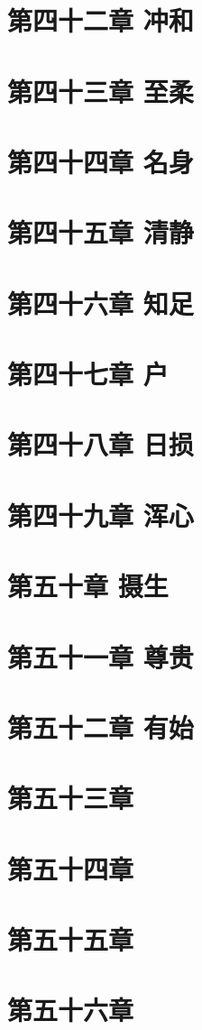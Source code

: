 \documentclass[UTF8]{ctexbook}
\begin{document}
	\section{第四十二章 冲和}
	\section{第四十三章 至柔}
	\section{第四十四章 名身}
	\section{第四十五章 清静}
	\section{第四十六章 知足}
	\section{第四十七章 户}
	\section{第四十八章 日损}
	\section{第四十九章 浑心}
	\section{第五十章 摄生}
	\section{第五十一章 尊贵}
	\section{第五十二章 有始}
	\section{第五十三章}
	\section{第五十四章}
	\section{第五十五章}
	\section{第五十六章}
\end{document}
